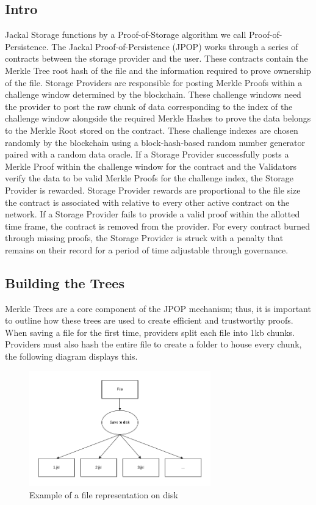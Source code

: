 \documentclass[a4paper]{article}
\begin{document}
\subsection{Intro}
Jackal Storage functions by a Proof-of-Storage algorithm we call Proof-of-Persistence. The Jackal Proof-of-Persistence (JPOP) works through a series of contracts between the storage provider and the user. These contracts contain the Merkle Tree root hash of the file and the information required to prove ownership of the file. Storage Providers are responsible for posting Merkle Proofs within a challenge window determined by the blockchain. These challenge windows need the provider to post the raw chunk of data corresponding to the index of the challenge window alongside the required Merkle Hashes to prove the data belongs to the Merkle Root stored on the contract. These challenge indexes are chosen randomly by the blockchain using a block-hash-based random number generator paired with a random data oracle.
If a Storage Provider successfully posts a Merkle Proof within the challenge window for the contract and the Validators verify the data to be valid Merkle Proofs for the challenge index, the Storage Provider is rewarded. Storage Provider rewards are proportional to the file size the contract is associated with relative to every other active contract on the network. If a Storage Provider fails to provide a valid proof within the allotted time frame, the contract is removed from the provider. For every contract burned through missing proofs, the Storage Provider is struck with a penalty that remains on their record for a period of time adjustable through governance.
\subsection{Building the Trees}
Merkle Trees are a core component of the JPOP mechanism; thus, it is important to outline how these trees are used to create efficient and trustworthy proofs. When saving a file for the first time, providers split each file into 1kb chunks. Providers must also hash the entire file to create a folder to house every chunk, the following diagram displays this.
\begin{figure}[!htbp]
\centering
\includegraphics[width=0.7\textwidth]{assets/tree1.png}
\caption{Example of a file representation on disk}
\end{figure}
\end{document}
